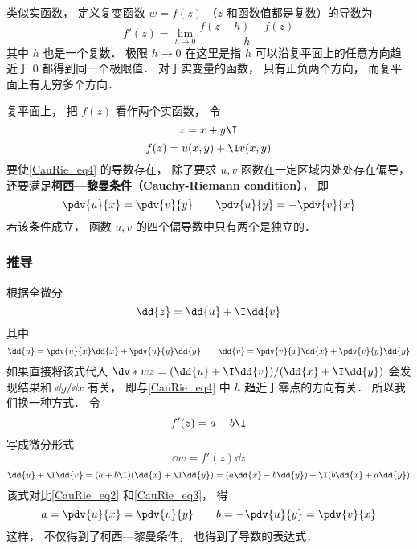 
\begin{issues}
\issueDraft
\end{issues}


类似实函数， 定义复变函数 $w = f(z)$ （$z$ 和函数值都是复数）的导数为
\begin{equation}\label{CauRie_eq4}
f'(z) = \lim_{h\to 0} \frac{f(z + h) - f(z)}{h}
\end{equation}
其中 $h$ 也是一个复数． 极限 $h \to 0$ 在这里是指 $h$ 可以沿复平面上的任意方向趋近于 $0$ 都得到同一个极限值． 对于实变量的函数， 只有正负两个方向， 而复平面上有无穷多个方向．

复平面上， 把 $f(z)$ 看作两个实函数， 令
\begin{equation}
z = x + y\I
\end{equation}
\begin{equation}
f(z) = u(x, y) + \I v(x, y)
\end{equation}
要使\autoref{CauRie_eq4} 的导数存在， 除了要求 $u, v$ 函数在一定区域内处处存在偏导， 还要满足\textbf{柯西—黎曼条件（Cauchy-Riemann condition）}， 即
\begin{equation}\label{CauRie_eq1}
\pdv{u}{x} = \pdv{v}{y} \qquad
\pdv{u}{y} = - \pdv{v}{x}
\end{equation}
若该条件成立， 函数 $u,v$ 的四个偏导数中只有两个是独立的．

\subsubsection{推导}
根据全微分
\begin{equation}\label{CauRie_eq2}
\dd{z} = \dd{u} + \I \dd{v}
\end{equation}
其中
\begin{equation}\label{CauRie_eq3}
\dd{u} = \pdv{u}{x} \dd{x} + \pdv{u}{y} \dd{y} \qquad
\dd{v} = \pdv{v}{x} \dd{x} + \pdv{v}{y} \dd{y}
\end{equation}
如果直接将该式代入 $\dv*{w}{z} = (\dd{u} + \I \dd{v})/(\dd{x} + \I \dd{y})$ 会发现结果和 $\dd{y}/\dd{x}$ 有关， 即与\autoref{CauRie_eq4} 中 $h$ 趋近于零点的方向有关． 所以我们换一种方式． 令
\begin{equation}
f'(z) = a + b\I
\end{equation}
写成微分形式
\begin{equation}
\dd{w} = f'(z)\dd{z}
\end{equation}
\begin{equation}
\dd{u} + \I \dd{v} = (a + b\I)(\dd{x} + \I\dd{y}) = (a \dd{x} - b\dd{y}) + \I (b \dd{x} + a\dd{y})
\end{equation}
该式对比\autoref{CauRie_eq2} 和\autoref{CauRie_eq3}， 得
\begin{equation}
a = \pdv{u}{x} = \pdv{v}{y} \qquad
b = -\pdv{u}{y} = \pdv{v}{x}
\end{equation}
这样， 不仅得到了柯西—黎曼条件， 也得到了导数的表达式．


